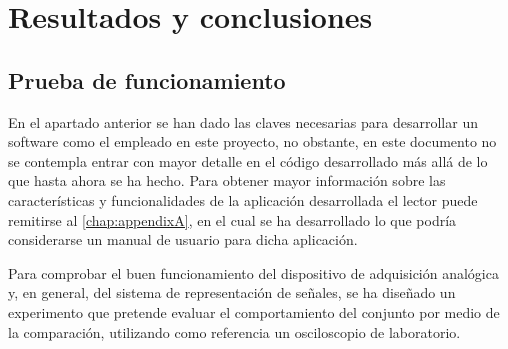 \chapter{Resultados y conclusiones}\label{chap:part1conclusions}

\section{Prueba de funcionamiento}\label{sec:working-test}

En el apartado anterior se han dado las claves necesarias para desarrollar
un software como el empleado en este proyecto, no obstante, en este
documento no se contempla entrar con mayor detalle en el código
desarrollado más allá de lo que hasta ahora se ha hecho. Para obtener mayor
información sobre las características y funcionalidades de la aplicación
desarrollada el lector puede remitirse al \vref{chap:appendixA}, en el cual
se ha desarrollado lo que podría considerarse un manual de usuario para
dicha aplicación.

Para comprobar el buen funcionamiento del dispositivo de adquisición
analógica y, en general, del sistema de representación de señales, se ha
diseñado un experimento que pretende evaluar el comportamiento del conjunto
por medio de la comparación, utilizando como referencia un osciloscopio de
laboratorio.

%

